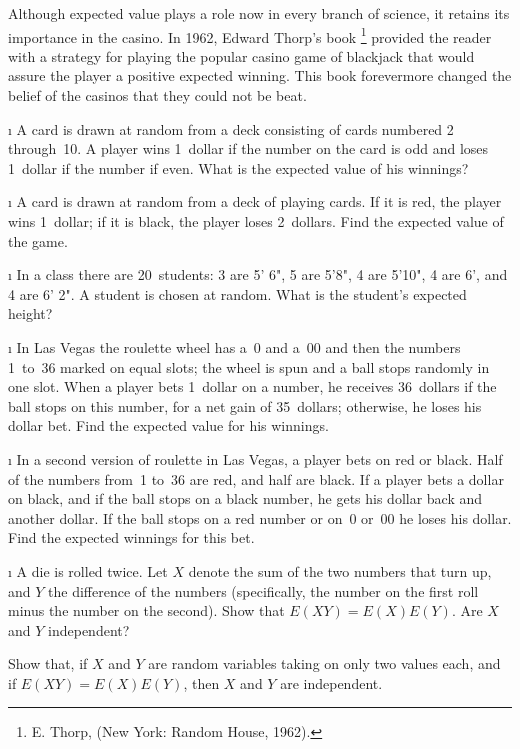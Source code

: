 Although expected value plays a role now in every branch of science, it retains its
importance in the casino.  In 1962, Edward Thorp's book \footnote{E. Thorp,  (New York: Random House, 1962).}
provided the reader with a strategy for playing the popular casino game of
blackjack that would assure the player a positive expected winning.  This book
forevermore changed the belief of the casinos that they could not be beat.

\exercises
\begin{LJSItem}

\i\label{exer 6.1.1} A card is drawn at random from a deck consisting of cards
numbered 2 through~10.  A player wins 1~dollar if the number on the card is odd and
loses 1~dollar if the number if even.  What is the expected value of his winnings?

\i\label{exer 6.1.2} A card is drawn at random from a deck of playing cards.  If
it is red, the player wins 1~dollar; if it is black, the player loses 2~dollars. 
Find the expected value of the game.

\i\label{exer 6.1.3} In a class there are 20~students: 3 are 5' 6", 5 are 5'8", 4
are 5'10", 4 are 6', and 4 are 6' 2".  A student is chosen at random.  What is the
student's expected height?

\i\label{exer 6.1.4} In Las Vegas the roulette wheel has a~0 and a~00 and then the
numbers 1~to~36 marked on equal slots; the wheel is spun and a ball stops randomly in
one slot.  When a player bets 1~dollar on a number, he receives 36~dollars if the
ball stops on this number, for a net gain of 35~dollars; otherwise, he loses his
dollar bet.  Find the expected value for his winnings.

\i\label{exer 6.1.5} In a second version of roulette in Las Vegas, a player bets
on red or black.  Half of the numbers from~1 to~36 are red, and half are black.  If a
player bets a dollar on black, and if the ball stops on a black number, he gets his
dollar back and another dollar.  If the ball stops on a red number or on~0 or~00 he
loses his dollar.  Find the expected winnings for this bet.

\i\label{exer 6.1.6} A die is rolled twice.  Let $X$ denote the sum of the two
numbers that turn up, and $Y$ the difference of the numbers (specifically, the number
on the first roll minus the number on the second).  Show that $E(XY) = E(X)E(Y)$.  Are
$X$ and $Y$ independent?

\istar\label{exer 6.1.7} Show that, if $X$ and $Y$ are random variables taking on
only two values each, and if $E(XY) = E(X)E(Y)$, then $X$ and $Y$ are independent.


\end{LJSItem}
